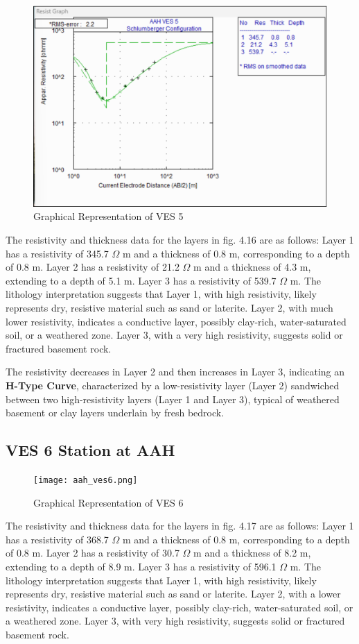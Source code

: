 \documentclass[12pt,a4paper]{report}
\begin{document}
\begin{figure}[H]
    \centering
    \includegraphics[width=1.0\textwidth]{aah_ves5.png}
    \caption{Graphical Representation of VES 5}
    \label{fig:AAH_VES_5_Curve}
\end{figure}
The resistivity and thickness data for the layers in fig.  4.16 are as follows: Layer 1 has a resistivity of 345.7 $\Omega$ m and a thickness of 0.8 m, corresponding to a depth of 0.8 m. Layer 2 has a resistivity of 21.2 $\Omega$ m and a thickness of 4.3 m, extending to a depth of 5.1 m. Layer 3 has a resistivity of 539.7 $\Omega$ m. The lithology interpretation suggests that Layer 1, with high resistivity, likely represents dry, resistive material such as sand or laterite. Layer 2, with much lower resistivity, indicates a conductive layer, possibly clay-rich, water-saturated soil, or a weathered zone. Layer 3, with a very high resistivity, suggests solid or fractured basement rock.

The resistivity decreases in Layer 2 and then increases in Layer 3, indicating an \textbf{H-Type Curve}, characterized by a low-resistivity layer (Layer 2) sandwiched between two high-resistivity layers (Layer 1 and Layer 3), typical of weathered basement or clay layers underlain by fresh bedrock.

\subsection{VES 6 Station at AAH}

\begin{figure}[H]
    \centering
    \texttt{[image: aah\_ves6.png]}
    \caption{Graphical Representation of VES 6}
    \label{fig:AAH_VES_6_Curve}
\end{figure}
The resistivity and thickness data for the layers in fig. 4.17 are as follows: Layer 1 has a resistivity of 368.7 $\Omega$ m and a thickness of 0.8 m, corresponding to a depth of 0.8 m. Layer 2 has a resistivity of 30.7 $\Omega$ m and a thickness of 8.2 m, extending to a depth of 8.9 m. Layer 3 has a resistivity of 596.1 $\Omega$ m. The lithology interpretation suggests that Layer 1, with high resistivity, likely represents dry, resistive material such as sand or laterite. Layer 2, with a lower resistivity, indicates a conductive layer, possibly clay-rich, water-saturated soil, or a weathered zone. Layer 3, with very high resistivity, suggests solid or fractured basement rock. 
\end{document}
